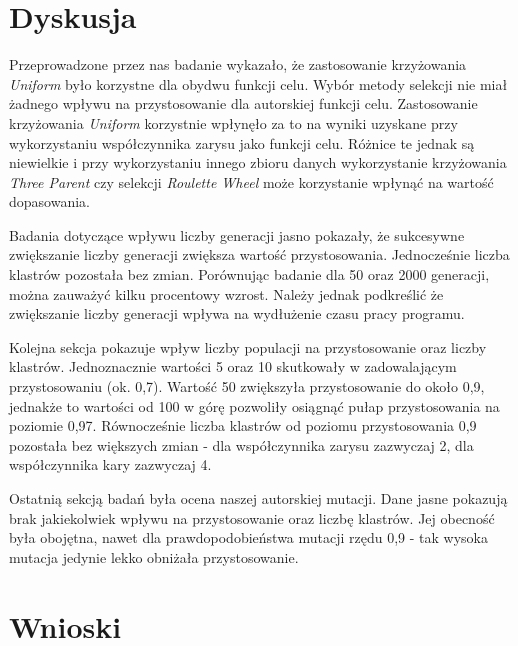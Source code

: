 \documentclass{classrep}
\begin{document}
\clearpage
\section{Dyskusja}

Przeprowadzone przez nas badanie wykazało, że zastosowanie krzyżowania \textit{Uniform} było korzystne dla obydwu funkcji celu. Wybór metody selekcji nie miał żadnego wpływu na przystosowanie dla autorskiej funkcji celu. Zastosowanie krzyżowania \textit{Uniform} korzystnie wpłynęło za to na wyniki uzyskane przy wykorzystaniu współczynnika zarysu jako funkcji celu. Różnice te jednak są niewielkie i przy wykorzystaniu innego zbioru danych wykorzystanie krzyżowania \textit{Three Parent} czy selekcji \textit{Roulette Wheel} może korzystanie wpłynąć na wartość dopasowania.

Badania dotyczące wpływu liczby generacji jasno pokazały, że sukcesywne zwiększanie liczby generacji zwiększa wartość przystosowania. Jednocześnie liczba klastrów pozostała bez zmian. Porównując badanie dla 50 oraz 2000 generacji, można zauważyć kilku procentowy wzrost. Należy jednak podkreślić że zwiększanie liczby generacji wpływa na wydłużenie czasu pracy programu.

Kolejna sekcja pokazuje wpływ liczby populacji na przystosowanie oraz liczby klastrów. Jednoznacznie wartości 5 oraz 10 skutkowały w zadowalającym przystosowaniu (ok. 0,7). Wartość 50 zwiększyła przystosowanie do około 0,9, jednakże to wartości od 100 w górę pozwoliły osiągnąć pułap przystosowania na poziomie 0,97. Równocześnie liczba klastrów od poziomu przystosowania 0,9 pozostała bez większych zmian - dla współczynnika zarysu zazwyczaj 2, dla współczynnika kary zazwyczaj 4.

Ostatnią sekcją badań była ocena naszej autorskiej mutacji. Dane jasne pokazują brak jakiekolwiek wpływu na przystosowanie oraz liczbę klastrów. Jej obecność była obojętna, nawet dla prawdopodobieństwa mutacji rzędu 0,9 - tak wysoka mutacja jedynie lekko obniżała przystosowanie.

\section{Wnioski}
\end{document}
